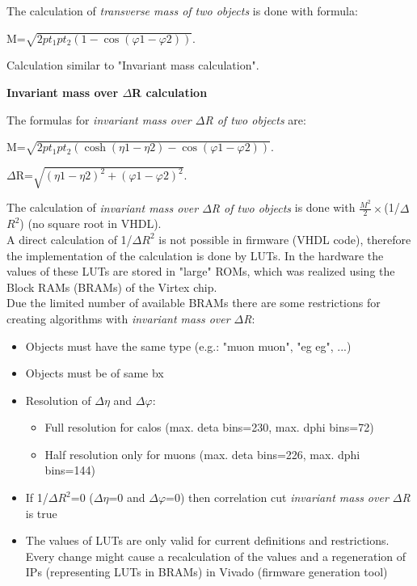 The calculation of \textit{transverse mass of two objects} is done with formula:

M=$\sqrt{2 pt_1 pt_2 (1-\cos(\varphi1-\varphi2))}$.

Calculation similar to "Invariant mass calculation".

\textbf{Invariant mass over $\Delta$R calculation}
\label{sec:gtl:inv_mass_div_dr_calculation}

The formulas for \textit{invariant mass over $\Delta$R of two objects} are:

M=$\sqrt{2 pt_1  pt_2 (\cosh(\eta1-\eta2)-\cos(\varphi1-\varphi2))}$.

$\Delta$R=$\sqrt{(\eta1-\eta2)^2+(\varphi1-\varphi2)^2}$.

The calculation of \textit{invariant mass over $\Delta$R of two objects} is done with $\frac{M^2}{2}\times$(1/$\Delta$$R^2$) (no square root in VHDL).\\
A direct calculation of 1/$\Delta$$R^2$ is not possible in firmware (VHDL code), therefore the implementation of the calculation is done by LUTs. In the hardware the values of these LUTs are stored in "large" ROMs, which was realized using the Block RAMs (BRAMs) of the Virtex chip.\\
Due the limited number of available BRAMs there are some restrictions for creating algorithms with \textit{invariant mass over $\Delta$R}:
\begin{itemize}
\item Objects must have the same type (e.g.: "muon muon", "eg eg", ...)
\item Objects must be of same bx
\item Resolution of $\Delta\eta$ and $\Delta\varphi$:
  \begin{itemize}
  \item Full resolution for calos (max. deta bins=230, max. dphi bins=72)
  \item Half resolution only for muons (max. deta bins=226, max. dphi bins=144)
  \end{itemize}
\item If 1/$\Delta$$R^2$=0 ($\Delta\eta$=0 and $\Delta\varphi$=0) then correlation cut \textit{invariant mass over $\Delta$R} is true
\item The values of LUTs are only valid for current definitions and restrictions. Every change might cause a recalculation of the values and a regeneration of IPs (representing LUTs in BRAMs) in Vivado (firmware generation tool)
\end{itemize}

